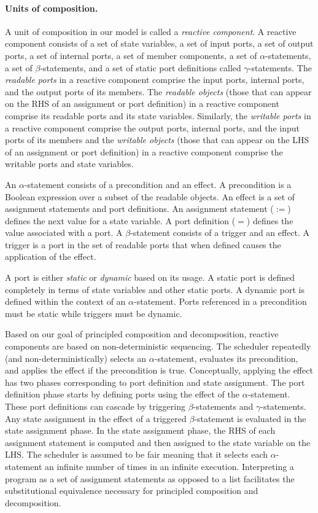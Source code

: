 \paragraph{Units of composition.}
A unit of composition in our model is called a \emph{reactive component}.
A reactive component consists of a set of state variables, a set of input ports, a set of output ports, a set of internal ports, a set of member components, a set of $\alpha$-statements, a set of $\beta$-statements, and a set of static port definitions called $\gamma$-statements.
The \emph{readable ports} in a reactive component comprise the input ports, internal ports, and the output ports of its members.
The \emph{readable objects} (those that can appear on the RHS of an assignment or port definition) in a reactive component comprise its readable ports and its state variables.
Similarly, the \emph{writable ports} in a reactive component comprise the output ports, internal ports, and the input ports of its members and the \emph{writable objects} (those that can appear on the LHS of an assignment or port definition) in a reactive component comprise the writable ports and state variables.

An $\alpha$-statement consists of a precondition and an effect.
A precondition is a Boolean expression over a subset of the readable objects.
An effect is a set of assignment statements and port definitions.
An assignment statement ($:=$) defines the next value for a state variable.
A port definition ($=$) defines the value associated with a port.
A $\beta$-statement consists of a trigger and an effect.
A trigger is a port in the set of readable ports that when defined causes the application of the effect.

A port is either \emph{static} or \emph{dynamic} based on its usage.
A static port is defined completely in terms of state variables and other static ports.
A dynamic port is defined within the context of an $\alpha$-statement.
Ports referenced in a precondition must be static while triggers must be dynamic.

Based on our goal of principled composition and decomposition, reactive components are based on non-deterministic sequencing.
The scheduler repeatedly (and non-deterministically) selects an $\alpha$-statement, evaluates its precondition, and applies the effect if the precondition is true.
Conceptually, applying the effect has two phases corresponding to port definition and state assignment.
The port definition phase starts by defining ports using the effect of the $\alpha$-statement.
These port definitions can cascade by triggering $\beta$-statements and $\gamma$-statements.
Any state assignment in the effect of a triggered $\beta$-statement is evaluated in the state assignment phase.
In the state assignment phase, the RHS of each assignment statement is computed and then assigned to the state variable on the LHS.
The scheduler is assumed to be fair meaning that it selects each $\alpha$-statement an infinite number of times in an infinite execution.
Interpreting a program as a set of assignment statements as opposed to a list facilitates the substitutional equivalence necessary for principled composition and decomposition.

